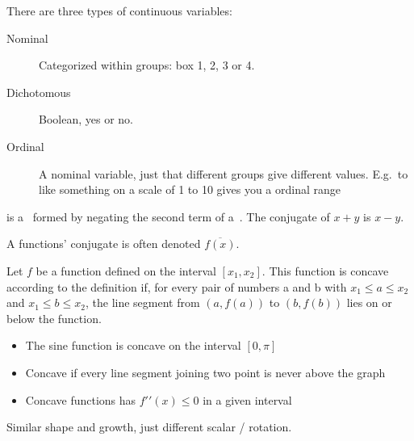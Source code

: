 \begin{definition}
    There are three types of continuous variables:
    \begin{center}
    \begin{description}
        \item[Nominal] Categorized within groups: box 1, 2, 3 or 4.
        \item[Dichotomous] Boolean, yes or no.
        \item[Ordinal] A nominal variable, just that different groups give
            different values. E.g.\ to like something on a scale of 1 to 10
            gives you a ordinal range
    \end{description}
\end{center}
\end{definition}

\begin{definition}[Conjugate]
    is a~ formed by negating the second term of
    a~. The conjugate of $x + y$ is $x − y$.

    A functions' conjugate is often denoted $\overline{f(x)}$.

\end{definition}

\begin{definition}[Concave]
    Let $f$ be a function defined on the interval $[x_{1}, x_{2}]$.
    This function is concave according to the definition if, for every pair of
    numbers a and b with $x_{1} \leq a \leq x_{2}$ and $x_{1} \leq b \leq
    x_{2}$, the line segment from $(a,  f (a))$ to $(b,  f (b))$
    lies on or below the function.

    \begin{itemize}
        \item The sine function is concave on the interval $[0, \pi]$
        \item Concave if every line segment joining two point is never above
              the graph 
        \item Concave functions has $f\prime\prime(x) \leq 0$ in a given
              interval 
    \end{itemize}
\end{definition}

\begin{definition}[Congruence]
    Similar shape and growth, just different scalar / rotation.
\end{definition}


